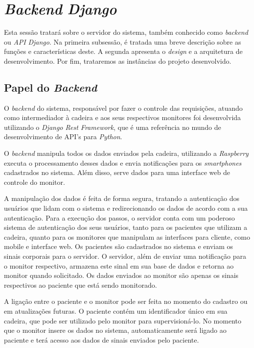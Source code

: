 \section{\textit{Backend} \textit{Django}}
Esta sessão tratará sobre o servidor do sistema, também conhecido como \textit{backend}
ou \textit{API} \textit{Django}. Na primeira subsessão, é tratada uma breve descrição sobre as funções
e características deste. A segunda apresenta o \textit{design} e a arquitetura
de desenvolvimento. Por fim, trataremos as instâncias do projeto desenvolvido.


\subsection{Papel do \textit{Backend}}
\label{sub:papel_da_api}
O \textit{backend} do sistema, responsável por fazer o controle das requisições,
atuando como intermediador à cadeira e aos seus respectivos monitores
foi desenvolvida utilizando o \textit{Django Rest Framework}, que é uma
referência no mundo de desenvolvimento de API's para \textit{Python}.

O \textit{backend} manipula todos os dados enviados pela cadeira, utilizando a \textit{Raspberry}
executa o processamento desses dados e envia notificações para os \textit{smartphones}
cadastrados no sistema. Além disso, serve dados para uma interface web de controle
do monitor.

A manipulação dos dados é feita de forma segura, tratando a autenticação dos usuários
que lidam com o sistema e redirecionando os dados de acordo com a sua autenticação.
Para a execução dos passos, o servidor conta com um poderoso sistema de autenticação
dos seus usuários, tanto para os pacientes que utilizam a cadeira, quanto para os
monitores que manipulam as interfaces para cliente, como mobile e interface web.
Os pacientes são cadastrados no sistema e enviam os sinais corporais para o servidor.
O servidor, além de enviar uma notificação para o monitor respectivo, armazena este
sinal em sua base de dados e retorna ao monitor quando solicitado.
Os dados enviados ao monitor são apenas os sinais respectivos ao paciente que está
sendo monitorado.

A ligação entre o paciente e o monitor pode ser feita no momento do cadastro ou em
atualizações futuras. O paciente contém um identificador único em sua cadeira, que
pode ser utilizado pelo monitor para supervisioná-lo. No momento que o monitor insere
os dados no sistema, automaticamente será ligado ao paciente e terá acesso aos dados
de sinais enviados pelo paciente.


